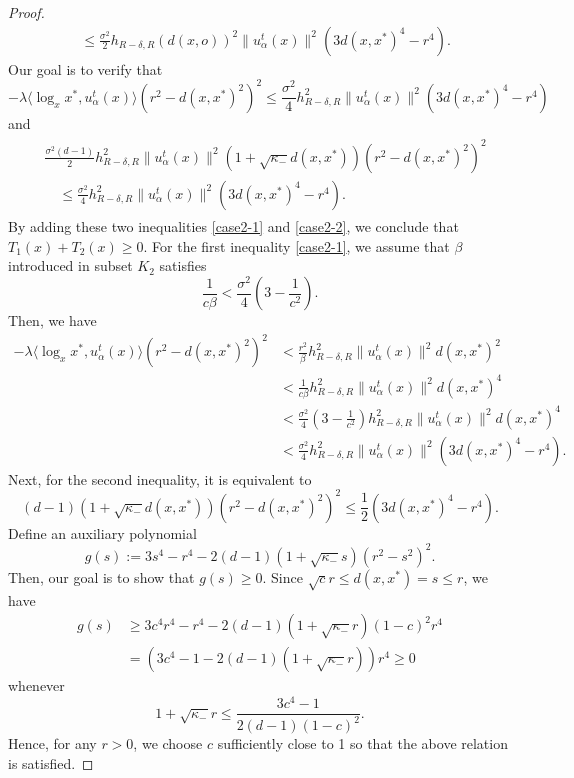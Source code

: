 \documentclass[11pt]{amsart}
\newcommand{\p}{o}%
\newcommand{\dist}{d}%
\begin{document}
\begin{proof}
\begin{align*}
&\leq  \frac{\sigma^2    }{2}  h_{R-\delta,R}\left(\dist(x, \p)\right)^2\|u_\alpha^t(x)\|^2   (3d(x,x^*)^4-r^4  ).
\end{align*}
Our goal is to verify  that
\begin{equation} \label{case2-1}
 -\lambda \langle \log_xx^*,u_\alpha^t(x)\rangle(r^2 - d(x,x^*)^2)^2  \leq \frac{\sigma^2   }{4} h_{R-\delta,R}^2 \|u_\alpha^t(x)\|^2   (3d(x,x^*)^4-r^4  )
\end{equation}
and
\begin{align} \label{case2-2}
\begin{aligned}
  &\frac{\sigma^2   (d-1)}{2}h_{R-\delta,R}^2\|u_\alpha^t(x)\|^2 (1+\sqrt{\kappa_-} d(x,x^*) )(r^2 - d(x,x^*)^2)^2 \\
  &\quad \leq \frac{\sigma^2   }{4}h_{R-\delta,R}^2 \|u_\alpha^t(x)\|^2   (3d(x,x^*)^4-r^4  ).
\end{aligned}
\end{align}
 By adding these two inequalities \eqref{case2-1} and \eqref{case2-2}, we conclude that $T_1(x)+T_2(x)\geq0$. For the first inequality \eqref{case2-1}, we assume that $\beta$ introduced in subset $K_2$ satisfies
\begin{equation} \label{const-beta}
\frac{1}{c\beta} <\frac{\sigma^2  }{4}\left(3-\frac{1}{c^2}\right).
\end{equation}
Then, we have
\begin{align*}
 -\lambda \langle \log_xx^*,u_\alpha^t(x)\rangle(r^2 - d(x,x^*)^2)^2 &<  \frac{r^2}{\beta}h_{R-\delta,R}^2 \|u_\alpha^t(x)\|^2 d(x,x^*)^2 \\
 &< \frac{1}{c\beta}h_{R-\delta,R}^2 \|u_\alpha^t(x)\|^2 d(x,x^*)^4 \\
 &<\frac{\sigma^2  }{4}\left(3-\frac{1}{c^2}\right)h_{R-\delta,R}^2 \|u_\alpha^t(x)\|^2 d(x,x^*)^4  \\
 & < \frac{\sigma^2  }{4} h_{R-\delta,R}^2 \|u_\alpha^t(x)\|^2 (3d(x,x^*)^4 - r^4).
\end{align*}
Next, for the second inequality, it is equivalent to 
\[
(d-1)( 1+ \sqrt{\kappa_-}d(x,x^*)) (r^2 - d(x,x^*)^2)^2 \leq \frac{1}{2}  (3d(x,x^*)^4-r^4  ).
\]
Define an auxiliary polynomial
\[
g(s) := 3s^4 - r^4 - 2(d-1)(1+\sqrt{\kappa_-}s)(r^2- s^2)^2.
\]
Then, our goal is to show that $g(s)\geq0$. Since $\sqrt cr\leq d(x,x^*)=s\leq r$, we have
\begin{align*}
g(s) &\geq 3c^4 r^4-r^4 - 2(d-1)(1+\sqrt{\kappa_-}r)(1-c)^2 r^4 \\
&= ( 3c^4 -1 - 2(d-1)(1+\sqrt{\kappa_-}r))r^4 \geq0
\end{align*}
whenever
\[
1+\sqrt{\kappa_-} r \leq \frac{3c^4-1}{2(d-1)(1-c)^2}.
\]
Hence, for any $r>0$, we choose $c$ sufficiently close to 1 so that the above relation is satisfied. \newline



\end{proof}
\end{document}
